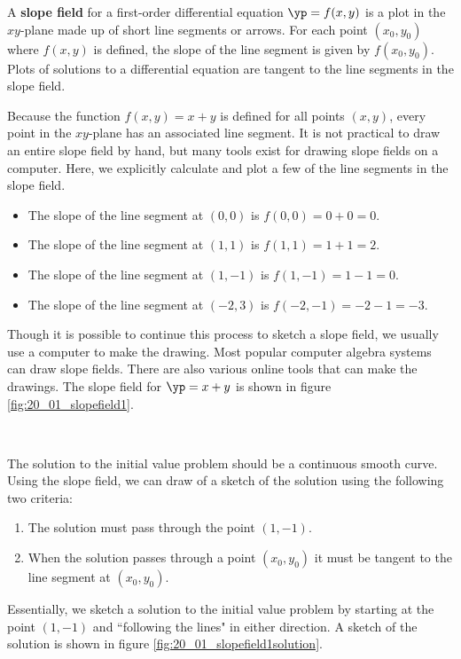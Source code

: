 {A \textbf{slope field} for a first-order differential equation $\yp = f(x,y)$ is a plot in the $xy$-plane made up of short line segments or arrows. For each point $(x_0,y_0)$ where $f(x,y)$ is defined, the slope of the line segment is given by $f(x_0,y_0)$. Plots of solutions to a differential equation are tangent to the line segments in the slope field.}\\

{Because the function $f(x,y) = x+y$ is defined for all points $(x,y)$, every point in the $xy$-plane has an associated line segment. It is not practical to draw an entire slope field by hand, but many tools exist for drawing slope fields on a computer.  Here, we explicitly calculate and plot a few of the line segments in the slope field.

\begin{itemize}
\item The slope of the line segment at $(0,0)$ is $f(0,0) = 0 + 0 = 0.$
\item The slope of the line segment at $(1,1)$ is $f(1,1) = 1 + 1 = 2.$
\item The slope of the line segment at $(1,-1)$ is $f(1,-1) = 1 - 1 = 0.$
\item The slope of the line segment at $(-2,3)$ is $f(-2,-1) = -2 - 1 = -3.$
\end{itemize}

Though it is possible to continue this process to sketch a slope field, we usually use a computer to make the drawing.  Most popular computer algebra systems can draw slope fields.  There are also various online tools that can make the drawings.  The slope field for $\yp = x+y$ is shown in figure \ref{fig:20_01_slopefield1}.
}\\


{The solution to the initial value problem should be a continuous smooth curve.  Using the slope field, we can draw of a sketch of the solution using the following two criteria:

\begin{enumerate}
\item The solution must pass through the point $(1,-1)$.
\item When the solution passes through a point $(x_0,y_0)$ it must be tangent to the line segment at $(x_0,y_0)$.
\end{enumerate}
Essentially, we sketch a solution to the initial value problem by starting at the point $(1,-1)$ and ``following the lines" in either direction.  A sketch of the solution is shown in figure \ref{fig:20_01_slopefield1solution}.
}\\

